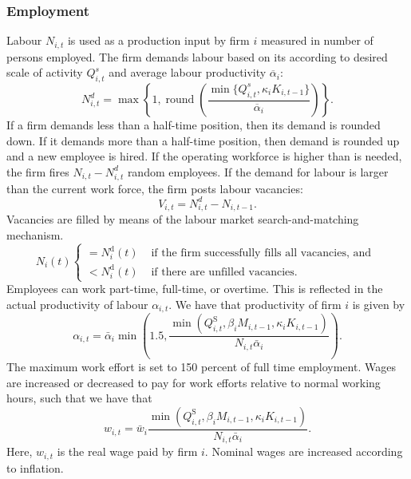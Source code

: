 \subsubsection{Employment}
Labour $N_{i,t}$ is used as a production input by firm $i$ measured in number of persons employed. The firm demands labour based on its according to desired scale of activity $Q^s_{i,t}$ and average labour productivity $\overline{\alpha}_i$:
\begin{equation}
    N^d_{i,t} = \max \left\{ 1, \operatorname{round}\left(\frac{\min \{ Q_{i,t}^s,\kappa_i K_{i,t-1}\}}{\overline{\alpha}_i}\right) \right\}.
\end{equation}
If a firm demands less than a half-time position, then its demand is rounded down. If it demands more than a half-time position, then demand is rounded up and a new employee is hired. If the operating workforce is higher than is needed, the firm fires $N_{i,t}-N^d_{i,t}$ random employees. If the demand for labour is larger than the current work force, the firm posts labour vacancies:
\begin{equation}
    V_{i,t} = N^d_{i,t} -N_{i,t-1}.
\end{equation}
Vacancies are filled by means of the labour market search-and-matching mechanism.
\begin{equation}
 N_i(t) \begin{cases}=N_i^{\mathrm{d}}(t) & \text { if the firm successfully fills all vacancies, and } \\ <N_i^{\mathrm{d}}(t) & \text { if there are unfilled vacancies. }\end{cases}   
\end{equation}
 Employees can work part-time, full-time, or overtime. This is reflected in the actual productivity of labour $\alpha_{i,t}$. We have that productivity of firm 
$i$ is given by
\begin{equation}
\alpha_{i,t}=\bar{\alpha}_i \min\left(1.5,\frac{\min \left(Q_{i,t}^{\mathrm{S}}, \beta_i M_{i,t-1}, \kappa_i K_{i,t-1}\right)}{N_{i,t} \bar{\alpha}_i}\right).
\end{equation}
The maximum work effort is set to 150 percent of full time employment. Wages are increased or decreased to pay for work efforts relative to normal working hours, such that we have that 
\begin{equation}
w_{i,t}=\bar{w}_i  \frac{\min \left(Q_{i,t}^{\mathrm{S}}, \beta_i M_{i,t-1}, \kappa_i K_{i,t-1}\right)}{N_{i,t} \bar{\alpha}_i}.
\end{equation}
Here, $w_{i,t}$ is the real wage paid by firm $i$. Nominal wages are increased according to inflation.
